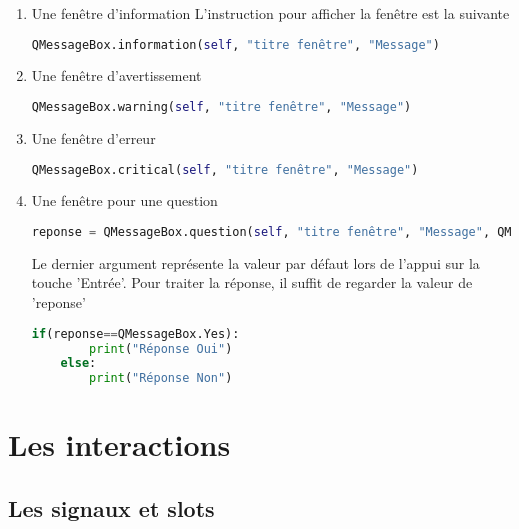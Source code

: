 \documentclass[12pt]{report}    %
\begin{document}
\begin{enumerate}
    \item Une fenêtre d'information
    L'instruction pour afficher la fenêtre est la suivante
    \begin{lstlisting}[language=Python]
    QMessageBox.information(self, "titre fenêtre", "Message")
    \end{lstlisting}
    \item Une fenêtre d'avertissement
    \begin{lstlisting}[language=Python]
    QMessageBox.warning(self, "titre fenêtre", "Message")
    \end{lstlisting}
    \item Une fenêtre d'erreur
    \begin{lstlisting}[language=Python]
    QMessageBox.critical(self, "titre fenêtre", "Message")
    \end{lstlisting}
    \item Une fenêtre pour une question 
    \begin{lstlisting}[language=Python]
    reponse = QMessageBox.question(self, "titre fenêtre", "Message", QMessageBox.Yes | QMessageBox.No, QMessageBox.No)
    \end{lstlisting}
    Le dernier argument représente la valeur par défaut lors de l'appui sur la touche 'Entrée'. \newline
    Pour traiter la réponse, il suffit de regarder la valeur de 'reponse'
    \begin{lstlisting}[language=Python]
    if(reponse==QMessageBox.Yes):
        print("Réponse Oui")
    else:
        print("Réponse Non")
    \end{lstlisting}
\end{enumerate}





\chapter{Les interactions}

\section{Les signaux et slots}
\end{document}

